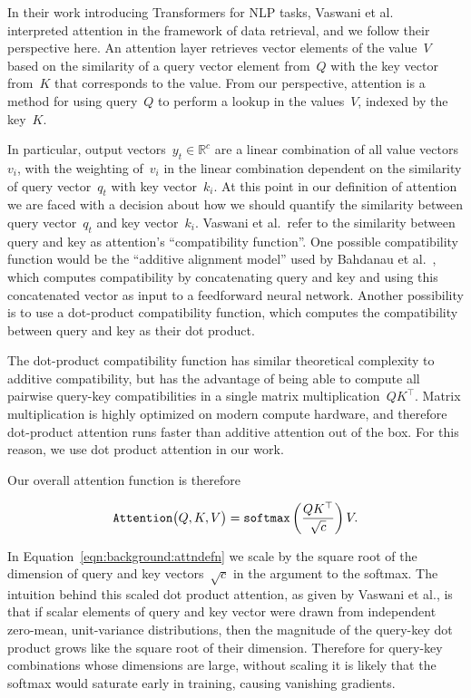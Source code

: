 In their work introducing Transformers for NLP tasks, Vaswani et
al.~\cite{vaswani2017attention} interpreted attention in the framework of data
retrieval, and we follow their perspective here.
An attention layer retrieves vector elements of the value~$V$ based on the
similarity of a query vector element from~$Q$ with the key vector from~$K$ that
corresponds to the value.
From our perspective, attention is a method for using query~$Q$ to perform a
lookup in the values~$V$, indexed by the key~$K$.

In particular, output vectors~$y_t \in \mathbb{R}^c$ are a linear combination
of all value vectors~$v_i$, with the weighting of~$v_i$ in the linear
combination dependent on the similarity of query vector~$q_t$ with key
vector~$k_i$.
At this point in our definition of attention we are faced with a decision about
how we should quantify the similarity between query vector~$q_t$ and key
vector~$k_i$.
Vaswani et al.\ refer to the similarity between query and key as attention's
``compatibility function''.
One possible compatibility function would be the ``additive alignment model''
used by Bahdanau et al.~\cite{bahdanau2015neuralmt}, which computes
compatibility by concatenating query and key and using this concatenated vector
as input to a feedforward neural network.
Another possibility is to use a dot-product compatibility function, which
computes the compatibility between query and key as their dot product.

The dot-product compatibility function has similar theoretical complexity to
additive compatibility, but has the advantage of being able to compute all
pairwise query-key compatibilities in a single matrix
multiplication~$QK^\top$.
Matrix multiplication is highly optimized on modern compute hardware, and
therefore dot-product attention runs faster than additive attention out of the
box.
For this reason, we use dot product attention in our work.

Our overall attention function is therefore

\begin{equation}
\mathtt{Attention}\big(Q, K, V\big) = \mathtt{softmax}{}\left(\frac{QK^\top}{\sqrt{c}}\right) V.
\label{eqn:background:attndefn}
\end{equation}

In Equation~\ref{eqn:background:attndefn} we scale by the square root of the
dimension of query and key vectors~$\sqrt{c}$ in the argument to the softmax.
The intuition behind this scaled dot product attention, as given by Vaswani et
al., is that if scalar elements of query and key vector were drawn from
independent zero-mean, unit-variance distributions, then the magnitude of the
query-key dot product grows like the square root of their dimension.
Therefore for query-key combinations whose dimensions are large, without
scaling it is likely that the softmax would saturate early in training, causing
vanishing gradients.


